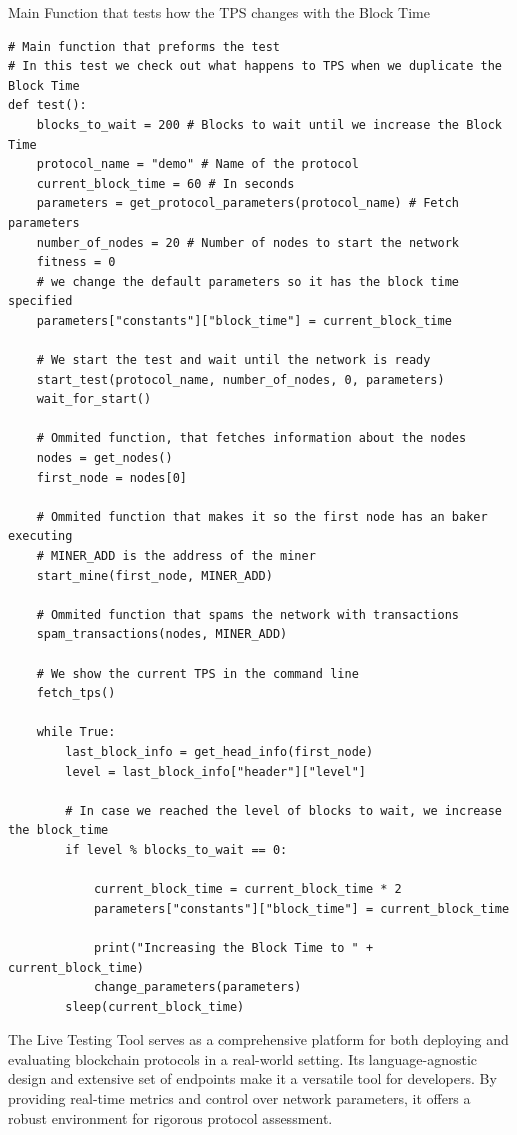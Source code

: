 \begin{listing}[H]
\caption{Main Function that tests how the TPS changes with the Block Time}
\label{lst:python_code}
\begin{verbatim}
# Main function that preforms the test
# In this test we check out what happens to TPS when we duplicate the Block Time
def test():
    blocks_to_wait = 200 # Blocks to wait until we increase the Block Time
    protocol_name = "demo" # Name of the protocol
    current_block_time = 60 # In seconds
    parameters = get_protocol_parameters(protocol_name) # Fetch parameters 
    number_of_nodes = 20 # Number of nodes to start the network
    fitness = 0 
    # we change the default parameters so it has the block time specified
    parameters["constants"]["block_time"] = current_block_time

    # We start the test and wait until the network is ready
    start_test(protocol_name, number_of_nodes, 0, parameters)
    wait_for_start()

    # Ommited function, that fetches information about the nodes
    nodes = get_nodes()
    first_node = nodes[0] 

    # Ommited function that makes it so the first node has an baker executing
    # MINER_ADD is the address of the miner
    start_mine(first_node, MINER_ADD)

    # Ommited function that spams the network with transactions
    spam_transactions(nodes, MINER_ADD)

    # We show the current TPS in the command line
    fetch_tps()

    while True:
        last_block_info = get_head_info(first_node)
        level = last_block_info["header"]["level"]
        
        # In case we reached the level of blocks to wait, we increase the block_time
        if level % blocks_to_wait == 0:

            current_block_time = current_block_time * 2
            parameters["constants"]["block_time"] = current_block_time

            print("Increasing the Block Time to " + current_block_time)
            change_parameters(parameters)
        sleep(current_block_time)
\end{verbatim}
\end{listing}


The Live Testing Tool serves as a comprehensive platform for both deploying and evaluating blockchain protocols in a real-world setting. Its language-agnostic design and extensive set of endpoints make it a versatile tool for developers. By providing real-time metrics and control over network parameters, it offers a robust environment for rigorous protocol assessment.



